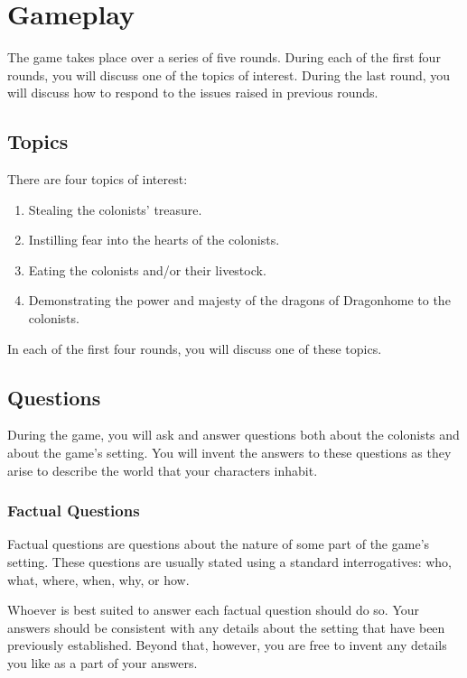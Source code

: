 \documentclass[a6paper, 11pt, parskip=half, DIV=15]{scrartcl}
\begin{document}
\section*{Gameplay}
The game takes place over a series of five rounds. 
During each of the first four rounds, you will discuss one of the topics of interest.
During the last round, you will discuss how to respond to the issues raised in previous rounds. 

\subsection*{Topics}
There are four topics of interest:
\begin{enumerate}[nosep]
	\item Stealing the colonists' treasure.
	\item Instilling fear into the hearts of the colonists.
	\item Eating the colonists and/or their livestock.
	\item Demonstrating the power and majesty of the dragons of Dragonhome to the colonists.
\end{enumerate}
In each of the first four rounds, you will discuss one of these topics.

\newpage
\enlargethispage{1.75\baselineskip}

\subsection*{Questions}
During the game, you will ask and answer questions both about the colonists and about the game's setting.
You will invent the answers to these questions as they arise to describe the world that your characters inhabit.

\subsubsection*{Factual Questions}
Factual questions are questions about the nature of some part of the game's setting.
These questions are usually stated using a standard interrogatives: who, what, where, when, why, or how.

Whoever is best suited to answer each factual question should do so.
Your answers should be consistent with any details about the setting that have been previously established.
Beyond that, however, you are free to invent any details you like as a part of your answers.

\newpage
\enlargethispage{1.75\baselineskip}
\end{document}
